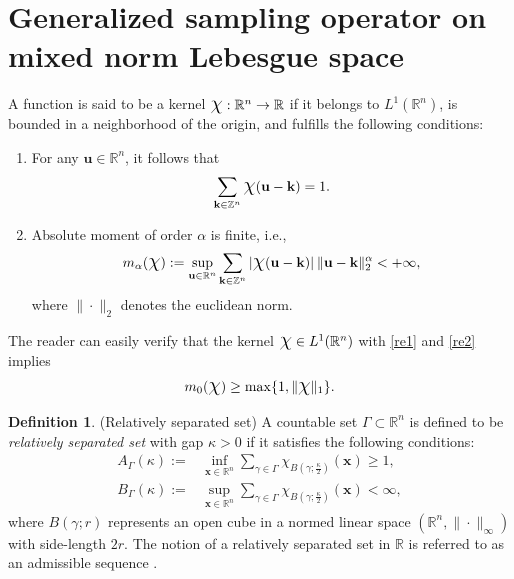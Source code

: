 \documentclass[11pt, a4paper]{article}
\theoremstyle{definition}
\newtheorem{defin}[thm]{Definition}
\numberwithin{equation}{section}
\def\ZZ{\mathbb Z}
\def\RR{\mathbb R}
\def\Chi{\mbox{\Large$\chi$}}
\begin{document}
\section{Generalized sampling operator on mixed norm Lebesgue space}\label{3}
A function is said to be a kernel $\Chi: \RR^{n}\rightarrow \RR$ if it belongs to $L^{1}(\RR^n)$, is bounded in a neighborhood of the origin, and fulfills the following conditions:
\begin{enumerate}
    \item For any ${\textbf {u}}\in \RR^n$, it follows that 
    \begin{equation} \label{re1}
        \sum_{\textbf{k}\in \ZZ^n}\Chi(\textbf{u}-\textbf{k})=1 .
    \end{equation}

    \item  Absolute moment of order $\alpha$ is finite, i.e.,
    \begin{equation}\label{re2}
        m_{\alpha}(\Chi) := \sup_{\textbf{u} \in \RR^n}\sum_{\textbf{k}\in \ZZ^n}|\Chi(\textbf{u}-\textbf{k})| \hspace{2pt}\|\textbf{u}-\textbf{k}\|^{\alpha}_2<+\infty,
    \end{equation}
    where $\|\cdot\|_2$ denotes the euclidean norm.
\end{enumerate}

The reader can easily verify that the kernel $\Chi\in L^1(\RR^n)$ with \eqref{re1} and \eqref{re2} implies $$m_0(\Chi) \geq \max\{1,\|\Chi\|_1\}.$$

\begin{defin}(Relatively separated set)
    A countable set \(\Gamma \subset \mathbb{R}^n\) is defined to be \emph{relatively separated set} with gap \(\kappa > 0\) if it satisfies the following conditions:
    \begin{align*}
        A_\Gamma(\kappa) :=& \inf_{\textbf{x} \in \mathbb{R}^n} \sum_{\gamma \in \Gamma} \chi_{B\left(\gamma; \frac{\kappa}{2}\right)}(\textbf{x}) \geq 1,\\
        B_\Gamma(\kappa) :=& \sup_{\textbf{x} \in \mathbb{R}^n} \sum_{\gamma \in \Gamma} \chi_{B\left(\gamma; \frac{\kappa}{2}\right)}(\textbf{x}) < \infty,
    \end{align*}
    where \( B(\gamma; r) \) represents an open cube in a normed linear space $(\RR^n,\|\cdot\|_{\infty})$ with side-length \( 2r \).
    The notion of a relatively separated set in $\RR$ is referred to as an admissible sequence \cite{delta}.
\end{defin}
\end{document}
